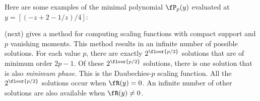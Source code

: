 \begin{example}
\label{tbl:Pyz}
Here are some examples of the minimal polynomial $\fP_p(y)$ evaluated at
$y=[(-z+2-1/z)/4]$:
\end{example}




 (next)
gives a method for computing scaling functions with compact support
and $p$ vanishing moments.
This method results in an infinite number of possible solutions.
For each value $p$, there are exactly
$2^\floor{p/2}$ solutions that are of minimum order
$2p-1$.
Of these $2^\floor{p/2}$ solutions, there is one solution that
is also {\em minimum phase}.
This is the Daubechies-$p$ scaling function.
All the $2^\floor{p/2}$ solutions occur when
$\fR(y)=0$.
An infinite number of other solutions are also available when
$\fR(y)\ne 0$.

